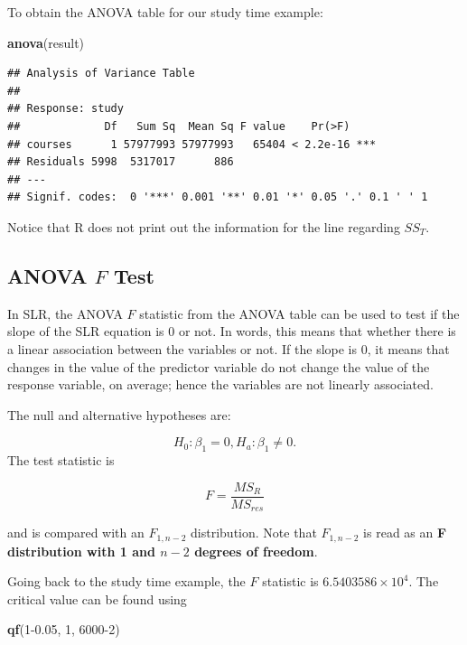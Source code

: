 \documentclass[
]{book}
\newenvironment{Shaded}{\begin{snugshade}}{\end{snugshade}}
\newcommand{\DecValTok}[1]{\textcolor[rgb]{0.00,0.00,0.81}{#1}}
\newcommand{\FloatTok}[1]{\textcolor[rgb]{0.00,0.00,0.81}{#1}}
\newcommand{\FunctionTok}[1]{\textcolor[rgb]{0.13,0.29,0.53}{\textbf{#1}}}
\newcommand{\NormalTok}[1]{#1}
\begin{document}
To obtain the ANOVA table for our study time example:

\begin{Shaded}
\begin{Highlighting}[]
\FunctionTok{anova}\NormalTok{(result)}
\end{Highlighting}
\end{Shaded}

\begin{verbatim}
## Analysis of Variance Table
## 
## Response: study
##             Df   Sum Sq  Mean Sq F value    Pr(>F)    
## courses      1 57977993 57977993   65404 < 2.2e-16 ***
## Residuals 5998  5317017      886                      
## ---
## Signif. codes:  0 '***' 0.001 '**' 0.01 '*' 0.05 '.' 0.1 ' ' 1
\end{verbatim}

Notice that R does not print out the information for the line regarding \(SS_T\).

\subsection{\texorpdfstring{ANOVA \(F\) Test}{ANOVA F Test}}\label{anova-f-test}

In SLR, the ANOVA \(F\) statistic from the ANOVA table can be used to test if the slope of the SLR equation is 0 or not. In words, this means that whether there is a linear association between the variables or not. If the slope is 0, it means that changes in the value of the predictor variable do not change the value of the response variable, on average; hence the variables are not linearly associated.

The null and alternative hypotheses are:

\[
H_0: \beta_1 = 0, H_a: \beta_1 \neq 0.
\]
The test statistic is

\begin{equation} 
F = \frac{MS_R}{MS_{res}}
\label{eq:ANOVA}
\end{equation}

and is compared with an \(F_{1,n-2}\) distribution. Note that \(F_{1,n-2}\) is read as an \textbf{F distribution with 1 and \(n-2\) degrees of freedom}.

Going back to the study time example, the \(F\) statistic is \ensuremath{6.5403586\times 10^{4}}. The critical value can be found using

\begin{Shaded}
\begin{Highlighting}[]
\FunctionTok{qf}\NormalTok{(}\DecValTok{1}\FloatTok{{-}0.05}\NormalTok{, }\DecValTok{1}\NormalTok{, }\DecValTok{6000{-}2}\NormalTok{)}
\end{Highlighting}
\end{Shaded}
\end{document}
